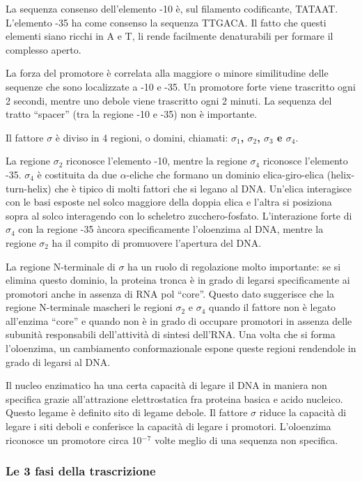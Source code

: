 \documentclass[]{article}
\begin{document}
La sequenza consenso dell'elemento -10 è, sul filamento codificante,
TATAAT. L'elemento -35 ha come consenso la sequenza TTGACA. Il fatto che
questi elementi siano ricchi in A e T, li rende facilmente denaturabili
per formare il complesso aperto.

La forza del promotore è correlata alla maggiore o minore similitudine
delle sequenze che sono localizzate a -10 e -35. Un promotore forte
viene trascritto ogni 2 secondi, mentre uno debole viene trascritto ogni
2 minuti. La sequenza del tratto ``spacer'' (tra la regione -10 e -35)
non è importante.

Il fattore $\sigma$ è diviso in 4 regioni, o domini, chiamati:
\textbf{$\sigma$$_1$, $\sigma$$_2$, $\sigma$$_3$ e $\sigma$$_4$}.

La regione $\sigma$$_2$ riconosce l'elemento -10, mentre la regione
$\sigma$$_4$ riconosce l'elemento -35. $\sigma$$_4$ è costituita da due
$\alpha$-eliche che formano un dominio elica-giro-elica
(helix-turn-helix) che è tipico di molti fattori che si legano al DNA.
Un'elica interagisce con le basi esposte nel solco maggiore della doppia
elica e l'altra si posiziona sopra al solco interagendo con lo scheletro
zucchero-fosfato. L'interazione forte di $\sigma$$_4$ con la regione -35
àncora specificamente l'oloenzima al DNA, mentre la regione $\sigma$$_2$
ha il compito di promuovere l'apertura del DNA.

La regione N-terminale di $\sigma$ ha un ruolo di regolazione molto
importante: se si elimina questo dominio, la proteina tronca è in grado
di legarsi specificamente ai promotori anche in assenza di RNA pol
``core''. Questo dato suggerisce che la regione N-terminale mascheri le
regioni $\sigma$$_2$ e $\sigma$$_4$ quando il fattore non è legato
all'enzima ``core'' e quando non è in grado di occupare promotori in
assenza delle subunità responsabili dell'attività di sintesi dell'RNA.
Una volta che si forma l'oloenzima, un cambiamento conformazionale
espone queste regioni rendendole in grado di legarsi al DNA.

Il nucleo enzimatico ha una certa capacità di legare il DNA in maniera
non specifica grazie all'attrazione elettrostatica fra proteina basica e
acido nucleico. Questo legame è definito sito di legame debole. Il
fattore $\sigma$ riduce la capacità di legare i siti deboli e conferisce
la capacità di legare i promotori. L'oloenzima riconosce un promotore
circa 10$^-$$^7$ volte meglio di una sequenza non specifica.

\subsubsection{Le 3 fasi della
trascrizione}\label{le-3-fasi-della-trascrizione}
\end{document}
